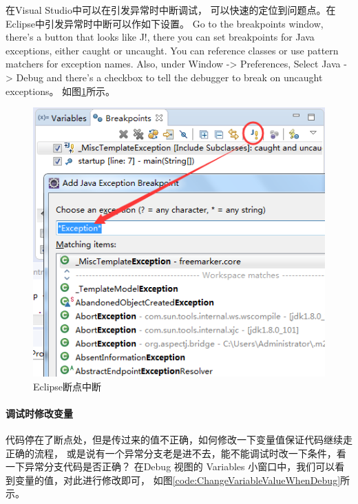 \documentclass{book}
\begin{document}
在Visual Studio中可以在引发异常时中断调试，
可以快速的定位到问题点。在Eclipse中引发异常时中断可以作如下设置。
Go to the breakpoints window, there's a button that looks like J!, 
there you can set breakpoints for Java exceptions, either caught or uncaught. 
You can reference classes or use pattern matchers for exception names.
Also, under Window -> Preferences, Select Java -> Debug and there's a 
checkbox to tell the debugger to break on uncaught exceptions。
如图\ref{code:EclipseBreakpointOnAllException}所示。

\begin{figure}[htbp]
	\centering
	\includegraphics[scale=0.5]{EclipseBreakpointOnAllException.png}
	\caption{Eclipse断点中断}
	\label{code:EclipseBreakpointOnAllException}
\end{figure}

\paragraph{调试时修改变量}

代码停在了断点处，但是传过来的值不正确，如何修改一下变量值保证代码继续走正确的流程，
或是说有一个异常分支老是进不去，能不能调试时改一下条件，看一下异常分支代码是否正确？
在Debug 视图的 Variables 小窗口中，我们可以看到变量的值，对此进行修改即可，
如图\ref{code:ChangeVariableValueWhenDebug}所示。 
\end{document}
